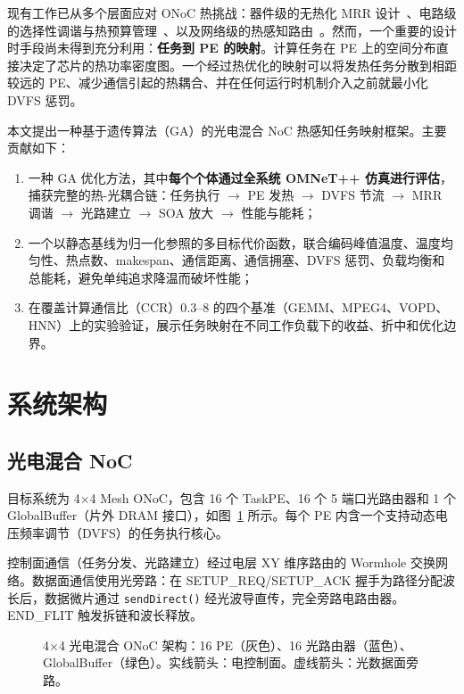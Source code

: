 \documentclass[conference]{IEEEtran}
\begin{document}
现有工作已从多个层面应对 ONoC 热挑战：器件级的无热化 MRR 设计~\cite{guha2012}、电路级的选择性调谐与热预算管理~\cite{zhou2013}、以及网络级的热感知路由~\cite{chittamuru2015}。然而，一个重要的设计时手段尚未得到充分利用：\textbf{任务到 PE 的映射}。计算任务在 PE 上的空间分布直接决定了芯片的热功率密度图。一个经过热优化的映射可以将发热任务分散到相距较远的 PE、减少通信引起的热耦合、并在任何运行时机制介入之前就最小化 DVFS 惩罚。

本文提出一种基于遗传算法（GA）的光电混合 NoC 热感知任务映射框架。主要贡献如下：

\begin{enumerate}
\item 一种 GA 优化方法，其中\textbf{每个个体通过全系统 OMNeT++ 仿真进行评估}，捕获完整的热-光耦合链：任务执行 $\rightarrow$ PE 发热 $\rightarrow$ DVFS 节流 $\rightarrow$ MRR 调谐 $\rightarrow$ 光路建立 $\rightarrow$ SOA 放大 $\rightarrow$ 性能与能耗；
\item 一个以静态基线为归一化参照的多目标代价函数，联合编码峰值温度、温度均匀性、热点数、makespan、通信距离、通信拥塞、DVFS 惩罚、负载均衡和总能耗，避免单纯追求降温而破坏性能；
\item 在覆盖计算通信比（CCR）0.3--8 的四个基准（GEMM、MPEG4、VOPD、HNN）上的实验验证，展示任务映射在不同工作负载下的收益、折中和优化边界。
\end{enumerate}

\section{系统架构}

\subsection{光电混合 NoC}

目标系统为 4$\times$4 Mesh ONoC，包含 16 个 TaskPE、16 个 5 端口光路由器和 1 个 GlobalBuffer（片外 DRAM 接口），如图~\ref{fig:arch} 所示。每个 PE 内含一个支持动态电压频率调节（DVFS）的任务执行核心。

控制面通信（任务分发、光路建立）经过电层 XY 维序路由的 Wormhole 交换网络。数据面通信使用光旁路：在 SETUP\_REQ/SETUP\_ACK 握手为路径分配波长后，数据微片通过 \texttt{sendDirect()} 经光波导直传，完全旁路电路由器。END\_FLIT 触发拆链和波长释放。

\begin{figure}[t]
\centering
\caption{4$\times$4 光电混合 ONoC 架构：16 PE（灰色）、16 光路由器（蓝色）、GlobalBuffer（绿色）。实线箭头：电控制面。虚线箭头：光数据面旁路。}
\label{fig:arch}
\end{figure}
\end{document}
